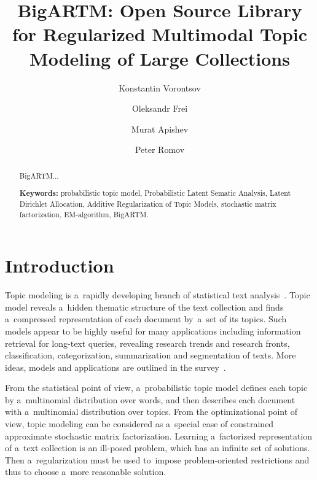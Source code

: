 \documentclass{llncs}
\begin{document}
\title{
    BigARTM: Open Source Library for
    Regularized Multimodal %
    Topic Modeling of Large Collections
}
\author{
    Konstantin Vorontsov
    \and
    Oleksandr Frei
    \and
    Murat Apishev
    \and
    Peter Romov
}

\maketitle

\begin{abstract}
    BigARTM...

\vspace{1em}
\textbf{Keywords:}
    probabilistic topic model,
    Probabilistic Latent Sematic Analysis,
    Latent Dirichlet Allocation,
    Additive Regularization of Topic Models,
    stochastic matrix factorization,
    EM-algorithm,
    BigARTM.
\end{abstract}

\section{Introduction}

Topic modeling is a~rapidly developing branch of statistical text analysis~\cite{blei12ptm}.
Topic model reveals a~hidden thematic structure of the text collection
and finds a~compressed representation of each document by~a~set of its topics.
Such models appear to be highly useful for many applications including
information retrieval for long-text queries,
revealing research trends and research fronts,
classification, categorization, summarization and segmentation of texts.
More ideas, models and applications are outlined in the survey~\cite{daud10knowledge}.

From the statistical point of view, a~probabilistic topic model
defines each topic by a~multinomial distribution over words,
and then describes each document with a~multinomial distribution over topics.
From the optimizational point of view,
topic modeling can be considered as a~special case
of constrained approximate stochastic matrix factorization.
Learning a~factorized representation of a~text collection
is an ill-posed problem, which has an infinite set of solutions.
Then a~regularization must be used
to~impose problem-oriented restrictions
and thus to choose a~more reasonable solution.
\end{document}
